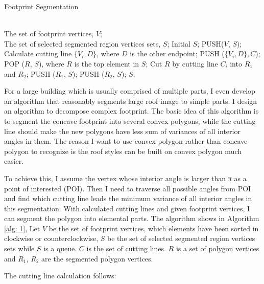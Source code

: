 \documentclass{iitthesis}
\begin{document}
{\linespread{1.5}
\begin{algorithm}[ht]   
	\caption{ Footprint Segmentation}   
	\label{alg: 1}   
	\begin{algorithmic}[1] 
		\REQUIRE ~~\\
		The set of footprint vertices, $V$; 
		\ENSURE ~~\\  
		The set of selected segmented region vertices sets, $S$; 
		\STATE Initial $S$;  
		\STATE PUSH($V$, $S$); 
					\STATE Calculate cutting line $\{V_i, D\}$, where $D$ is the other endpoint;
					\STATE PUSH ($\{V_i, D\}, C$);
				\ENDIF
			\ENDFOR
					\STATE POP ($R$, $S$), where $R$ is the top element in $S$;
					\STATE Cut $R$ by cutting line $C_i$ into $R_1$ and $R_2$;
					\STATE PUSH ($R_1$, $S$);
					\STATE PUSH ($R_2$, $S$);
				\ENDFOR
			\ENDFOR
		\ENDIF   
		\RETURN $S$; 
	\end{algorithmic}  
\end{algorithm}  
}

For a large building which is usually comprised of multiple parts, I even develop an algorithm that reasonably segments large roof image to simple parts. I design an algorithm to decompose complex footprint. The basic idea of this algorithm is to segment the concave footprint into several convex polygons, while the cutting line should make the new polygons have less sum of variances of all interior angles in them. The reason I want to use convex polygon rather than concave polygon to recognize is the roof styles can be built on convex polygon much easier. 

To achieve this, I assume the vertex whose interior angle is larger than π as a point of interested (POI). Then I need to traverse all possible angles from POI and find which cutting line leads the minimum variance of all interior angles in this segmentation. With calculated cutting lines and given footprint vertices, I can segment the polygon into elemental parts. The algorithm shows in Algorithm \ref{alg: 1}, Let $V$ be the set of footprint vertices, which elements have been sorted in clockwise or counterclockwise, $S$ be the set of selected segmented region vertices sets while $S$ is a queue. $C$ is the set of cutting lines. $R$ is a set of polygon vertices and $R_1$, $R_2$ are the segmented polygon vertices.

The cutting line calculation follows:
\end{document}
